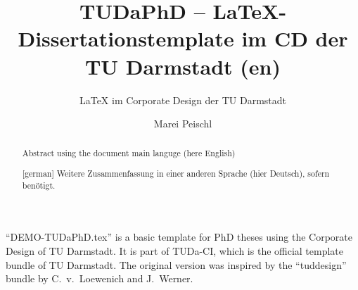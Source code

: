 \documentclass[
	english,%
	ruledheaders=chapter,%
	class=book,%
	thesis={%
			type=dr,
			dr=rernat
		},
	fontsize=11pt,%
	parskip=half-,%
	custommargins=true,%
	marginpar=false,%
	accentcolor=9c,%
]{tudapub}
\title{TUDaPhD -- \LaTeX-Dissertationstemplate im CD der TU Darmstadt (en)}
\subtitle{\LaTeX{} im Corporate Design der TU Darmstadt}
\author{Marei Peischl}
\institute{Institute}
\begin{document}
\frontmatter

\maketitle

\affidavit%
\begin{abstract}
	Abstract using the document main languge (here English)
\end{abstract}

\begin{abstract}[german]
	Weitere Zusammenfassung in einer anderen Sprache (hier Deutsch), sofern benötigt.
\end{abstract}

\tableofcontents

\mainmatter


\enquote{DEMO-TUDaPhD.tex} is a basic template for PhD theses
using the Corporate Design of TU Darmstadt.
It is part of TUDa-CI, which is the official template bundle of TU Darmstadt.
The original version was inspired by the \enquote{tuddesign} bundle by C.~v.~Loewenich and J.~Werner.

\printbibliography
\end{document}
